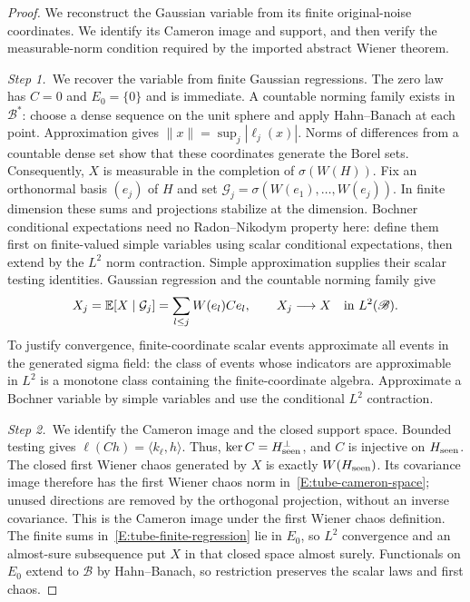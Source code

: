 \begin{proof}
  We reconstruct the Gaussian variable from its finite original-noise
  coordinates. We identify its Cameron image and support, and then verify the
  measurable-norm condition required by the imported abstract Wiener theorem.


  \medskip
  \noindent\textit{Step 1.~}We recover the variable from finite Gaussian
  regressions.
  The zero law has $C = 0$ and $E_0 = \{0\}$ and is immediate. A countable
  norming family exists in $\mathscr{B}^*$: choose a dense sequence on the unit
  sphere and apply Hahn--Banach at each point. Approximation gives $\|x\| =
  \sup_j|\ell_j(x)|$. Norms of differences from a countable dense set show that
  these coordinates generate the Borel sets. Consequently, $X$ is measurable in
  the completion of $\sigma(W(H))$. Fix an orthonormal basis $(e_j)$ of $H$ and
  set $\mathcal{G}_j = \sigma(W(e_1),\ldots,W(e_j))$. In finite dimension these
  sums and projections stabilize at the dimension. Bochner conditional
  expectations need no Radon--Nikodym property here: define them first on
  finite-valued simple variables using scalar conditional expectations, then
  extend by the $L^2$ norm contraction. Simple approximation supplies their
  scalar testing identities. Gaussian regression and the countable norming
  family give
  \begin{equation}\label{E:tube-finite-regression}
    X_j=\mathbb{E}[X\mid\mathcal{G}_j]
    =\sum_{l\le j}W(e_l)Ce_l,\qquad X_j\longrightarrow X
    \quad\hbox{in }L^2(\mathscr{B}).
  \end{equation}
  To justify convergence, finite-coordinate scalar events approximate all events
  in the generated sigma field: the class of events whose indicators are
  approximable in $L^2$ is a monotone class containing the finite-coordinate
  algebra. Approximate a Bochner variable by simple variables and use the
  conditional $L^2$ contraction.


  \medskip
  \noindent\textit{Step 2.~}We identify the Cameron image and the closed
  support space.
  Bounded testing gives $\ell(Ch) = \langle k_\ell,h\rangle$. Thus, $\ker C =
  H_{\rm seen}^\perp$, and $C$ is injective on $H_{\rm seen}$. The closed first
  Wiener chaos generated by $X$ is exactly $W(H_{\rm seen})$. Its covariance
  image therefore has the first Wiener chaos norm
  in~\eqref{E:tube-cameron-space}; unused directions are removed by the
  orthogonal projection, without an inverse covariance. This is the Cameron
  image under the first Wiener chaos definition. The finite sums
  in~\eqref{E:tube-finite-regression} lie in $E_0$, so $L^2$ convergence and an
  almost-sure subsequence put $X$ in that closed space almost surely.
  Functionals on $E_0$ extend to $\mathscr{B}$ by Hahn--Banach, so restriction
  preserves the scalar laws and first chaos.



\end{proof}
